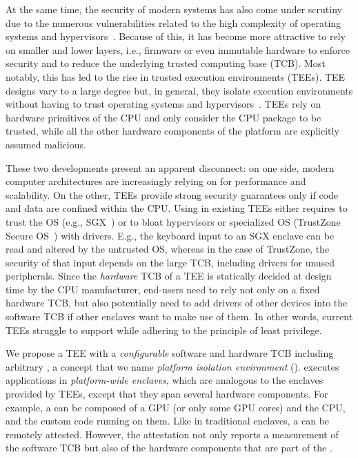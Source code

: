 At the same time, the security of modern systems has also come under scrutiny due to the numerous vulnerabilities related to the high complexity of operating systems and hypervisors~\cite{checkoway2013iago,suzaki2011memory}.
Because of this, it has become more attractive to rely on smaller and lower layers, i.e., firmware or even immutable hardware to enforce security and to reduce the underlying trusted computing base (TCB).
Most notably, this has led to the rise in trusted execution environments (TEEs). 
TEE designs vary to a large degree but, in general, they isolate execution environments without having to trust operating systems and hypervisors~\cite{costan2016intel,winter2008trusted,costan2016sanctum}. TEEs rely on hardware primitives of the CPU and only consider the CPU package to be trusted, while all the other hardware components of the platform are explicitly assumed malicious. 

These two developments present an apparent disconnect: on one side, modern computer architectures are increasingly relying on \sphw for performance and scalability. On the other, TEEs provide strong security guarantees only if code and data are confined within the CPU.
Using \sphw in existing TEEs either requires to trust the OS (e.g., SGX~\cite{costan2016intel}) or to bloat hypervisors or specialized OS (TrustZone Secure OS~\cite{TZOS}) with drivers. E.g., the keyboard input to an SGX enclave can be read and altered by the untrusted OS, whereas in the case of TrustZone, the security of that input depends on the large TCB, including drivers for unused peripherals. Since the \emph{hardware} TCB of a TEE is statically decided at design time by the CPU manufacturer, end-users need to rely not only on a fixed hardware TCB, but also potentially need to add drivers of other devices into the software TCB if other enclaves want to make use of them. In other words, current TEEs struggle to support \sphw while adhering to the principle of least privilege.

We propose a TEE with a \emph{configurable} software and hardware TCB including arbitrary \sphw, a concept that we name \emph{platform isolation environment} (\name). \name executes applications in \emph{platform-wide enclaves}, which are analogous to the enclaves provided by TEEs, except that they span several hardware components. For example, a \nameenclave{} can be composed of a GPU (or only some GPU cores) and the CPU, and the custom code running on them. Like in traditional enclaves, a \nameenclave{} can be remotely attested. However, the \name attestation not only reports a measurement of the software TCB but also of the hardware components that are part of the \nameenclave{}.


